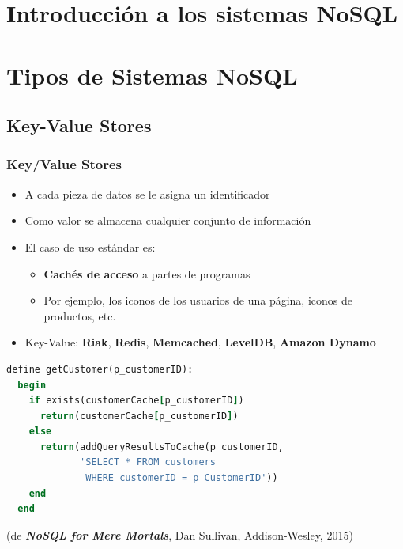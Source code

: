 \documentclass[14pt]{beamer}
\begin{document}



\section{Introducción a los sistemas NoSQL}



\section{Tipos de Sistemas NoSQL}

\subsection{Key-Value Stores}

\begin{frame}
  \frametitle{Key/Value Stores}
\begin{itemize}
\item A cada pieza de datos se le asigna un identificador
\item Como valor se almacena cualquier conjunto de información
\item El caso de uso estándar es:
  \begin{itemize}
  \item {\bf Cachés de acceso} a partes de programas
  \item Por ejemplo, los iconos de los usuarios de una página, iconos de
    productos, etc.
  \end{itemize}
\item Key-Value: {\bf Riak}, {\bf Redis}, {\bf Memcached}, {\bf LevelDB},
  {\bf Amazon Dynamo}
\end{itemize}

\framebreak

\begin{lstlisting}[language=ruby,morekeywords=define]
define getCustomer(p_customerID):
  begin
    if exists(customerCache[p_customerID])
      return(customerCache[p_customerID])
    else
      return(addQueryResultsToCache(p_customerID,
             'SELECT * FROM customers
              WHERE customerID = p_CustomerID'))
    end
  end
\end{lstlisting}

(de {\bfseries\itshape NoSQL for Mere Mortals}, Dan Sullivan,
Addison-Wesley, 2015)
\end{frame}
\end{document}
